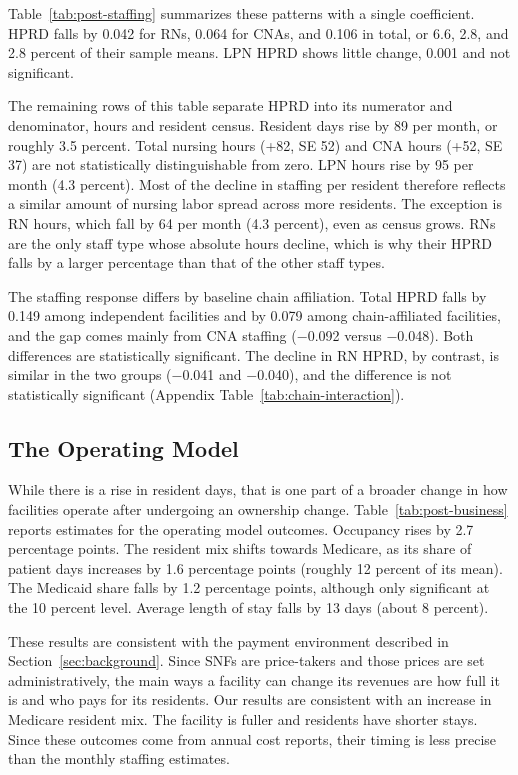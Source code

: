 \documentclass[12pt]{article}
\begin{document}
\normalsize
\doublespacing

Table~\ref{tab:post-staffing} summarizes these patterns with a single coefficient. HPRD falls by 0.042 for RNs, 0.064 for CNAs, and 0.106 in total, or 6.6, 2.8, and 2.8 percent of their sample means. LPN HPRD shows little change, 0.001 and not significant.

The remaining rows of this table separate HPRD into its numerator and denominator, hours and resident census. Resident days rise by 89 per month, or roughly 3.5 percent. Total nursing hours (+82, SE 52) and CNA hours (+52, SE 37) are not statistically distinguishable from zero. LPN hours rise by 95 per month (4.3 percent). Most of the decline in staffing per resident therefore reflects a similar amount of nursing labor spread across more residents. The exception is RN hours, which fall by 64 per month (4.3 percent), even as census grows. RNs are the only staff type whose absolute hours decline, which is why their HPRD falls by a larger percentage than that of the other staff types.

The staffing response differs by baseline chain affiliation. Total HPRD falls by 0.149 among independent facilities and by 0.079 among chain-affiliated facilities, and the gap comes mainly from CNA staffing ($-$0.092 versus $-$0.048). Both differences are statistically significant. The decline in RN HPRD, by contrast, is similar in the two groups ($-$0.041 and $-$0.040), and the difference is not statistically significant (Appendix Table~\ref{tab:chain-interaction}).


\FloatBarrier

\subsection{The Operating Model}

While there is a rise in resident days, that is one part of a broader change in how facilities operate after undergoing an ownership change. Table~\ref{tab:post-business} reports estimates for the operating model outcomes. Occupancy rises by 2.7 percentage points. The resident mix shifts towards Medicare, as its share of patient days increases by 1.6 percentage points (roughly 12 percent of its mean). The Medicaid share falls by 1.2 percentage points, although only significant at the 10 percent level. Average length of stay falls by 13 days (about 8 percent).

These results are consistent with the payment environment described in Section~\ref{sec:background}. Since SNFs are price-takers and those prices are set administratively, the main ways a facility can change its revenues are how full it is and who pays for its residents. Our results are consistent with an increase in Medicare resident mix. The facility is fuller and residents have shorter stays. Since these outcomes come from annual cost reports, their timing is less precise than the monthly staffing estimates. 
\end{document}
